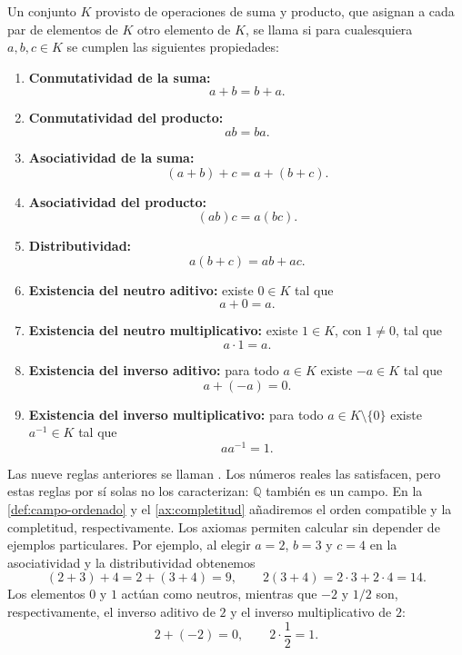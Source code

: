 \begin{samepage}
\begin{definition}
\label{def:campo}
Un conjunto $K$ provisto de operaciones de suma y producto, que asignan a cada par de elementos de $K$ otro elemento de $K$, se llama  si para cualesquiera $a,b,c\in K$ se cumplen las siguientes propiedades:

\begin{enumerate}
    \renewcommand{\labelenumi}{\Roman{enumi}.}

    \item \textbf{Conmutatividad de la suma:}
    \[
    a+b=b+a.
    \]

    \item \textbf{Conmutatividad del producto:}
    \[
    ab=ba.
    \]

    \item \textbf{Asociatividad de la suma:}
    \[
    (a+b)+c=a+(b+c).
    \]

    \item \textbf{Asociatividad del producto:}
    \[
    (ab)c=a(bc).
    \]

    \item \textbf{Distributividad:}
    \[
    a(b+c)=ab+ac.
    \]

    \item \textbf{Existencia del neutro aditivo:} existe $0\in K$ tal que
    \[
    a+0=a.
    \]

    \item \textbf{Existencia del neutro multiplicativo:} existe $1\in K$, con $1\neq0$, tal que
    \[
    a\cdot1=a.
    \]

    \item \textbf{Existencia del inverso aditivo:} para todo $a\in K$ existe $-a\in K$ tal que
    \[
    a+(-a)=0.
    \]

    \item \textbf{Existencia del inverso multiplicativo:} para todo $a\in K\setminus\{0\}$ existe $a^{-1}\in K$ tal que
    \[
    aa^{-1}=1.
    \]
\end{enumerate}

\end{definition}
\end{samepage}

Las nueve reglas anteriores se llaman . Los números reales las satisfacen, pero estas reglas por sí solas no los caracterizan: $\mathbb{Q}$ también es un campo. En la \cref{def:campo-ordenado} y el \cref{ax:completitud} añadiremos el orden compatible y la completitud, respectivamente. Los axiomas permiten calcular sin depender de ejemplos particulares. Por ejemplo, al elegir $a=2$, $b=3$ y $c=4$ en la asociatividad y la distributividad obtenemos
\[
(2+3)+4=2+(3+4)=9,
\qquad
2(3+4)=2\cdot3+2\cdot4=14.
\]
Los elementos $0$ y $1$ actúan como neutros, mientras que $-2$ y $1/2$ son, respectivamente, el inverso aditivo de $2$ y el inverso multiplicativo de $2$:
\[
2+(-2)=0,
\qquad
2\cdot\frac12=1.
\]

